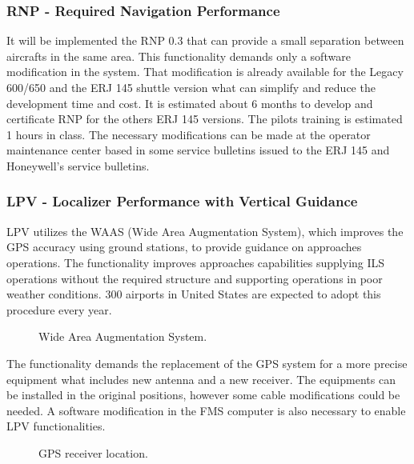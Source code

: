 \subsubsection{RNP - Required Navigation Performance}
It will be implemented the RNP 0.3 that can provide a small separation between aircrafts in the same area. This functionality demands only a software modification in the system. That modification is already available for the Legacy 600/650 and the ERJ 145 shuttle version what can simplify and reduce the development time and cost. It is estimated about 6 months to develop and certificate RNP for the others ERJ 145 versions. The pilots training is estimated 1 hours in class.  The necessary modifications can be made at the operator maintenance center based in some service bulletins issued to the ERJ 145 and Honeywell's service bulletins.

\subsubsection{LPV - Localizer Performance with Vertical Guidance}

LPV utilizes the WAAS (Wide Area Augmentation System), which improves the GPS accuracy using ground stations, to provide guidance on approaches operations. The functionality improves approaches capabilities supplying ILS operations without the required structure and supporting operations in poor weather conditions. 300 airports in United States are expected to adopt this procedure every year.

\begin{figure}[H] %
\caption{Wide Area Augmentation System.}
\label{fig:WideAreaAugmentationSystem}
\end{figure} 

The functionality demands the replacement of the GPS system for a more precise equipment what includes new antenna and a new receiver. The equipments can be installed in the original positions, however some cable modifications could be needed. A software modification in the FMS computer is also necessary to enable LPV functionalities.

\begin{figure}[H] %
\caption{GPS receiver location.}
\label{fig:GPSReceiverLocation}
\end{figure} 

